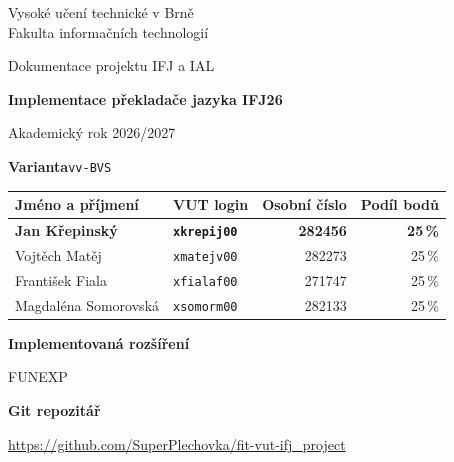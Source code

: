 \begin{titlepage}
\thispagestyle{empty}
\noindent Vysoké učení technické v Brně\\
Fakulta informačních technologií

\vspace{24mm}
{\Large Dokumentace projektu IFJ a IAL\par}
\vspace{4mm}
{\huge\bfseries Implementace překladače jazyka IFJ26\par}
\vspace{6mm}
{\large Akademický rok 2026/2027\par}

\vspace{16mm}
\noindent\textbf{Varianta}\quad \texttt{vv-BVS}

\vspace{8mm}
\noindent\begin{tabular*}{\linewidth}{@{\extracolsep{\fill}}llrr@{}}
\toprule
Jméno a příjmení & VUT login & Osobní číslo & Podíl bodů \\
\midrule
\textbf{Jan Křepinský} & \texttt{\textbf{xkrepij00}} & \textbf{282456} & \textbf{25\,\%} \\
Vojtěch Matěj & \texttt{xmatejv00} & 282273 & 25\,\% \\
František Fiala & \texttt{xfialaf00} & 271747 & 25\,\% \\
Magdaléna Somorovská & \texttt{xsomorm00} & 282133 & 25\,\% \\
\bottomrule
\end{tabular*}

\vspace{10mm}
\noindent\textbf{Implementovaná rozšíření}\par
FUNEXP

\vspace{6mm}
\noindent\textbf{Git repozitář}\par
\url{https://github.com/SuperPlechovka/fit-vut-ifj_project}
\end{titlepage}
